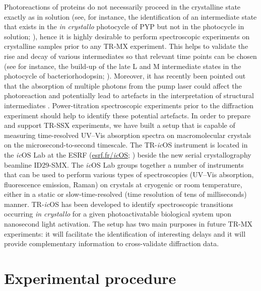 Photoreactions of proteins do not necessarily proceed in the crystalline state exactly as in solution (see, for instance, the identification of an intermediate state that exists in the \textit{in crystallo} photocycle of PYP but not in the photocycle in solution; \cite{konoldConfinementCrystalLattice2020}), hence it is highly desirable to perform spectroscopic experiments on crystalline samples prior to any TR-MX experiment. This helps to validate the rise and decay of various intermediates so that relevant time points can be chosen (see for instance, the build-up of the late L and M intermediate states in the photocycle of bacteriorhodopsin; \cite{nangoThreedimensionalMovieStructural2016}). Moreover, it has recently been pointed out that the absorption of multiple photons from the pump laser could affect the photoreaction and potentially lead to artefacts in the interpretation of structural intermediates \parencite{millerThreedimensionalViewUltrafast2020, barendsInfluencePumpLaser2024,bertrandStructuralEffectsHigh2024}. Power-titration spectroscopic experiments prior to the diffraction experiment should help to identify these potential artefacts.
In order to prepare and support TR-SSX experiments, we have built a setup that is capable of measuring time-resolved UV–Vis absorption spectra on macromolecular crystals on the microsecond-to-second timescale. The TR-\textit{ic}OS instrument is located in the \textit{ic}OS Lab at the ESRF (\href{https://www.esrf.fr/icOS}{esrf.fr/\textit{ic}OS}; \cite{vonstettenCrystalloOpticalSpectroscopy2015}) beside the new serial crystallography beamline ID29-SMX. The \textit{ic}OS Lab groups together a number of instruments that can be used to perform various types of spectroscopies (UV–Vis absorption, fluorescence emission, Raman) on crystals at cryogenic or room temperature, either in a static or slow-time-resolved (time resolution of tens of milliseconds) manner. TR-\textit{ic}OS has been developed to identify spectroscopic transitions occurring \textit{in crystallo} for a given photoactivatable biological system upon nanosecond light activation. The setup has two main purposes in future TR-MX experiments: it will facilitate the identification of interesting delays and it will provide complementary information to cross-validate diffraction data.



\section{Experimental procedure}



